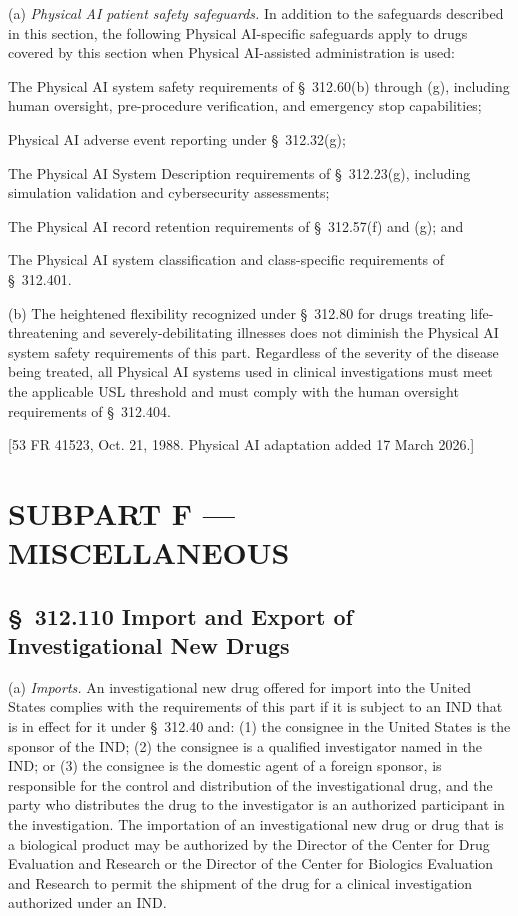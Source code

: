 (a) \textit{Physical AI patient safety safeguards.} In addition to the safeguards described in this section, the following Physical AI-specific safeguards apply to drugs covered by this section when Physical AI-assisted administration is used:

\begin{description}[leftmargin=0.8cm,style=sameline]
\item[(i)] The Physical AI system safety requirements of \S~312.60(b) through (g), including human oversight, pre-procedure verification, and emergency stop capabilities;
\item[(ii)] Physical AI adverse event reporting under \S~312.32(g);
\item[(iii)] The Physical AI System Description requirements of \S~312.23(g), including simulation validation and cybersecurity assessments;
\item[(iv)] The Physical AI record retention requirements of \S~312.57(f) and (g); and
\item[(v)] The Physical AI system classification and class-specific requirements of \S~312.401.
\end{description}

(b) The heightened flexibility recognized under \S~312.80 for drugs treating life-threatening and severely-debilitating illnesses does not diminish the Physical AI system safety requirements of this part. Regardless of the severity of the disease being treated, all Physical AI systems used in clinical investigations must meet the applicable USL threshold and must comply with the human oversight requirements of \S~312.404.

[53 FR 41523, Oct. 21, 1988. Physical AI adaptation added 17 March 2026.]

\clearpage

\section{SUBPART F --- MISCELLANEOUS}

\subsection{\S~312.110 Import and Export of Investigational New Drugs}

(a) \textit{Imports.} An investigational new drug offered for import into the United States complies with the requirements of this part if it is subject to an IND that is in effect for it under \S~312.40 and: (1) the consignee in the United States is the sponsor of the IND; (2) the consignee is a qualified investigator named in the IND; or (3) the consignee is the domestic agent of a foreign sponsor, is responsible for the control and distribution of the investigational drug, and the party who distributes the drug to the investigator is an authorized participant in the investigation. The importation of an investigational new drug or drug that is a biological product may be authorized by the Director of the Center for Drug Evaluation and Research or the Director of the Center for Biologics Evaluation and Research to permit the shipment of the drug for a clinical investigation authorized under an IND.


